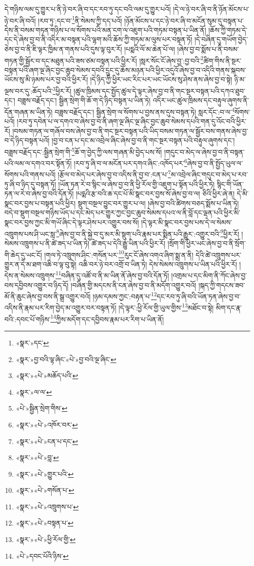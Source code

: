 དེ་གཉིས་ལམ་དུ་གྱུར་པ་ནི་ཉེ་བར་ཞི་བ་དང་རབ་ཏུ་དང་བའི་ལམ་དུ་གྱུར་པའོ། །དེ་ལ་ཉེ་བར་ཞི་བ་ནི་ཉོན་མོངས་པ་ཉེ་བར་ཞི་བའོ། །རབ་ཏུ་:དང་བ་\footnote{«སྣར་»དང་}ནི་སེམས་ཀྱི་དད་པའོ། །ཉོན་མོངས་པ་དང་ཉེ་བར་ཞི་བ་མངོན་སུམ་དུ་བསྟན་པ་དེས་ནི་བསམ་གཏན་གཉིས་པ་ལ་སོགས་པའི་མན་ངག་ལ་འཇུག་པའི་གཏམ་བསྟན་པ་ཡིན་ནོ། །ཆོས་ཀྱི་གཏམ་དེ་དང་དེ་ཞེས་བྱ་བ་ནི་འདིར་མ་བསྟན་པའི་ལྷག་མའི་ཆོས་ཀྱི་གཏམ་མ་ལུས་པར་བསྟན་ཏོ། །དེ་བཞིན་དུ་གཡོག་བྱེད་ཅེས་བྱ་བ་ནི་ཇི་ལྟར་ཁྱིམ་ན་གནས་པའི་དུས་ལྟ་བུར་རོ། །པདྨའི་ལོ་མ་ཆེན་པོ་ལ། །ཞེས་བྱ་བ་སྨོས་པ་ནི་བསམ་གཏན་གྱི་སྦྱོར་བ་དང་མཐུན་པའི་ཟས་ཙམ་བསྟན་པའི་ཕྱིར་རོ། །སླར་སོང་ངོ་ཞེས་བྱ་:བྱ་བའི་\footnote{«སྣར་»བྱ་བའི་ལྟ་ཞིང་«པེ་»བྱ་བའི་ལྔ་ཞིང་}ཚིག་གིས་ནི་སྔར་བསྟན་པའི་ཞག་ལྔ་ཞིང་བྱང་ཆུབ་སེམས་དབའི་དྲུང་དུ་ཆོས་མཉན་པའི་ཕྱིར་འདུའོ་ཞེས་བྱ་བ་འདིའི་གནས་སྐབས་ཡོངས་སུ་མི་ཉམས་པར་བྱ་བའི་ཕྱིར་རོ། །དེ་ཉིད་ཀྱི་ཕྱིར་ཡང་རིང་པར་ཡང་ཡོངས་སུ་ཤེས་ནས་ཞེས་བྱ་བ་སྟེ། ཉི་མ་ལྔས་བར་དུ་:ཆོད་པའི་\footnote{«སྣར་»«པེ་»མཆོད་པའི་}ཕྱིར་རོ། །ཚུལ་ཁྲིམས་དང་སྤྱོད་ཚུལ་དེ་ལྟར་ཞེས་བྱ་བ་ནི་གང་སྔར་བསྟན་པའི་དཀའ་ཐུབ་དང་། བཟླས་བརྗོད་དང་། སྦྱིན་སྲེག་གི་ཆོ་ག་དེ་ཉིད་བསྟན་པ་ཡིན་ཏེ། འདིར་ཡང་ཚུལ་ཁྲིམས་དང་བརྟུལ་ཞུགས་ནི་དོན་གཞན་མ་ཡིན་ཏེ། བཟླས་བརྗོད་དང་། སྦྱིན་སྲེག་ལ་སོགས་པ་བྱས་ནས་དུས་བསྟན་ཏེ། སླར་དོང་:བ་ལ་\footnote{«སྣར་»ལ་ལ་}སོགས་པའོ། །རབ་ཏུ་དབེན་པ་ལ་དགའ་བ་ཞེས་བྱ་བ་ནི་ཞག་ལྔ་ཞིང་ལྔ་ཞིང་བྱང་ཆུབ་སེམས་དཔའི་གན་དུ་འོང་བའི་ཕྱིར་རོ། །བསམ་གཏན་ལ་གཞོལ་བས་ཞེས་བྱ་བ་ནི་གང་སྔར་བསྟན་པའི་ཡིད་བསམ་གཏན་ལ་སྦྱོར་བས་གནས་ཞེས་བྱ་བ་དེ་ཉིད་བསྟན་པའོ། །བྱ་བ་ངན་པ་དང་མ་འབྲེལ་ཞིང་ཞེས་བྱ་བ་ནི་གང་སྔར་བསྟན་པའི་བརྟུལ་ཞུགས་དང་། བཟླས་བརྗོད་དང་:སྦྱིན་སྲེག་གི་\footnote{«པེ་»སྦྱིན་སྲེག་གིས་}ཆོ་ག་བྱེད་ཀྱི་ལས་གཞན་མི་བྱེད་པས་སོ། །གདུང་བ་མེད་ལ་ཞེས་བྱ་བ་ནི་བསྟན་པའི་ལམ་ལ་དགའ་བར་སྟོན་ཏོ། །རབ་ཏུ་ཞི་བ་ལ་མངོན་པར་དགའ་ཞིང་:འཁོད་པར་\footnote{«སྣར་»«པེ་»འཁོར་བར་}ཞེས་བྱ་བ་ནི་སྤྱོད་ཡུལ་ལ་སོགས་པའི་གནས་པའོ། །རྩོལ་བ་མེད་པར་ཞེས་བྱ་བ་འདིས་ནི་བྱ་བ་:ངན་པ་\footnote{«སྣར་»«པེ་»ངན་པ་དང་}མ་འབྲེལ་ཞིང་གདུང་བ་མེད་པ་རབ་ཏུ་ཞི་བ་ཉིད་དུ་བསྟན་ཏོ། །ཡོན་ཏན་རེ་བ་སྙིང་ལ་ཞེས་བྱ་བ་ནི་ཕྱི་རོལ་གྱི་འཇུག་པ་སྟོན་པའི་ཕྱིར་ཏེ། སྙིང་གི་ཡོན་ཏན་ལ་རེ་བ་ཞེས་བྱ་བའི་དོན་ཏོ། །པདྨའི་རྩ་བའི་ཆ་དང་པོ་མི་སྣང་བར་བྱས་སོ་ཞེས་བྱ་བ་ལ། ཅིའི་ཕྱིར་ཞེ་ན། དེ་མི་སྣང་བར་བྱས་པ་བསྟན་པའི་ཕྱིར། སྡུག་བསྔལ་བྱུང་བར་གྱུར་པ་ལ། །ཞེས་བྱ་བའི་ཚིགས་བཅད་སྨོས་པ་ཡིན་ཏེ། བདེ་བ་སྡུག་བསྔལ་གཉིས་ཡོད་པ་དང་མེད་པར་གྱུར་ཀྱང་བྱང་ཆུབ་སེམས་དཔའ་ལ་ནི་བློ་དང་ལྡན་པའི་ཕྱིར་མི་སྣང་བར་བྱས་ཀྱང་མི་གཡོ་ཞིང་དེ་ལྟར་ཤེས་པར་འགྱུར་བས་སོ། །དེ་ལྟར་མི་སྣང་བར་བྱས་པས་དེ་ལ་སེམས་འཁྲུགས་པས་ཤི་ཡང་སླ་\footnote{«སྣར་»«པེ་»བླ་}ཞེས་བྱ་བ་ནི་སྐྱེ་བ་དུ་མར་མི་སྡུག་པའི་རྣམ་པར་སྨིན་པའི་རྒྱུར་:འགྱུར་བའི་\footnote{«སྣར་»«པེ་»གྱུར་པའི་}ཕྱིར་རོ། །སེམས་འཁྲུགས་པ་ནི་ཚེ་ཟད་པ་ཡིན་ཏེ། ཚེ་ཟད་པ་དེའི་རྒྱུ་ཡིན་པའི་ཕྱིར་རོ། །སྲོག་གི་ཕྱིར་ཡང་ཞེས་བྱ་བ་ནི་སྲོག་གི་ཆེད་དུ་ཡང་ངོ། །གལ་ཏེ་འཁྲུགས་ཤིང་:གསོན་པར་\footnote{«སྣར་»«པེ་»གསོན་པ་}རུང་ངོ་ཞེས་འགའ་ཞིག་སྨྲ་ན་ནི། དེའི་ཚེ་འཁྲུགས་པར་གྱུར་ན་དེ་མ་ཐག་འཆི་བ་ལྟ་བུ་སྟེ། འཆི་བར་ཉེ་བར་འགྲོ་བ་ཡིན་ཏེ། དེས་སེམས་འཁྲུགས་པ་ཡིན་པའི་ཕྱིར་རོ། །དེས་ན་སེམས་འཁྲུགས་\footnote{«སྣར་»«པེ་»འཁྲུགས་པ་}བཞིན་དུ་འཚོ་བ་ནི་མ་ཡིན་ནོ་ཞེས་བྱ་བའི་དོན་ཏོ། །འགྲམ་པ་དང་མིག་ནི་ཀོང་ཞེས་བྱ་བས་དབྱིབས་འགྱུར་བ་ཉིད་དོ། །བཞིན་གྱི་མདངས་ནི་ངན་ཞེས་བྱ་བ་ནི་མདོག་འགྱུར་བའོ། །སྐད་ཀྱི་གདངས་ཟབ་མོ་ནི་ཆུང་ཞེས་བྱ་བས་ནི་སྒྲ་འགྱུར་བའོ། །ཉམ་དམས་ཀྱང་:བརྟན་པ་\footnote{«སྣར་»«པེ་»བསྟན་པ་}དང་རབ་ཏུ་ཞི་བའི་ཡོན་ཏན་ཞེས་བྱ་བ་འདིས་ནི་རྣམ་པར་རིག་བྱེད་མ་འགྱུར་བར་བསྟན་ཏོ། །དེ་ལྟར་:ཕྱི་རོལ་གྱི་ཡུལ་གྱིས་\footnote{«སྣར་»«པེ་»ཕྱི་རོལ་གྱི་}མཐོང་བ་སྟེ། མིག་དང་རྣ་བའི་:དབང་པོ་གཉིས་\footnote{«པེ་»དབང་པོའི་ཉིས་}ཀྱིས་མདོག་དང་དབྱིབས་རྣམ་པར་རིག་པ་ཡིན་ནོ། 